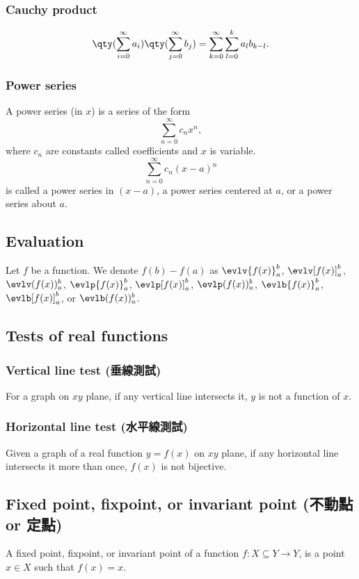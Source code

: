 \subsubsection{Cauchy product}
\[\qty(\sum_{i=0}^{\infty}a_i)\qty(\sum_{j=0}^{\infty}b_j)=\sum_{k=0}^{\infty}\sum_{l=0}^ka_lb_{k-l}.\]
\subsubsection{Power series}
A power series (in $x$) is a series of the form
\[\sum_{n=0}^{\infty}c_nx^n,\]
where $c_n$ are constants called coefficients and $x$ is variable.
\[\sum_{n=0}^{\infty}c_n(x-a)^n\]
is called a power series in $(x-a)$, a power series centered at $a$, or a power series about $a$.
\subsection{Evaluation}
Let $f$ be a function. We denote $f(b)-f(a)$ as $\evlv{f(x)}_a^b$, $\evlv[f(x)]_a^b$, $\evlv(f(x))_a^b$, $\evlp{f(x)}_a^b$, $\evlp[f(x)]_a^b$, $\evlp(f(x))_a^b$, $\evlb{f(x)}_a^b$, $\evlb[f(x)]_a^b$, or $\evlb(f(x))_a^b$.
\subsection{Tests of real functions}
\subsubsection{Vertical line test (垂線測試)}
For a graph on $xy$ plane, if any vertical line intersects it, $y$ is not a function of $x$.
\subsubsection{Horizontal line test (水平線測試)}
Given a graph of a real function $y=f(x)$ on $xy$ plane, if any horizontal line intersects it more than once, $f(x)$ is not bijective.
\subsection{Fixed point, fixpoint, or invariant point (不動點 or 定點)}
A fixed point, fixpoint, or invariant point of a function $f\colon X\subseteq Y\to Y$, is a point $x\in X$ such that $f(x)=x$.
